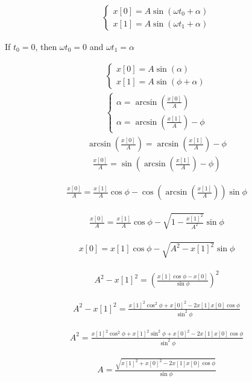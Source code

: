 \documentclass[fleqn]{article}
\begin{document}
\pagestyle{empty}

\begin{align*}
\begin{cases}
x[0]=A\sin(\omega t_{0}+\alpha)\\
x[1]=A\sin(\omega t_{1}+\alpha)
\end{cases}
\end{align*}

If $t_{0}=0$, then $\omega t_{0}=0$ and $\omega t_{1}=\alpha$

\begin{align*}
\begin{cases}
x[0]=A\sin(\alpha)\\
x[1]=A\sin(\phi+\alpha)
\end{cases}
\end{align*}
\begin{align*}
\begin{cases}
\alpha=\arcsin\left(\frac{x[0]}{A}\right)\\
\alpha=\arcsin\left(\frac{x[1]}{A}\right)-\phi
\end{cases}
\end{align*}
\begin{align*}
\arcsin\left(\frac{x[0]}{A}\right)=\arcsin\left(\frac{x[1]}{A}\right)-\phi
\end{align*}
\begin{align*}
\frac{x[0]}{A}=\sin\left(\arcsin\left(\frac{x[1]}{A}\right)-\phi\right)
\end{align*}

\begin{align*}
\frac{x[0]}{A}=\frac{x[1]}{A}\cos\phi-\cos\left(\arcsin\left(\frac{x[1]}{A}\right)\right)\sin\phi
\end{align*}

\begin{align*}
\frac{x[0]}{A}=\frac{x[1]}{A}\cos\phi-\sqrt{1-\frac{x[1]^{2}}{A^{2}}}\sin\phi
\end{align*}

\begin{align*}
x[0]=x[1]\cos\phi-\sqrt{A^{2}-x[1]^{2}}\sin\phi
\end{align*}

\begin{align*}
A^{2}-x[1]^{2}=\left(\frac{x[1]\cos\phi-x[0]}{\sin\phi}\right)^{2}
\end{align*}

\begin{align*}
A^{2}-x[1]^{2}=\frac{x[1]^{2}\cos^{2}\phi+x[0]^{2}-2x[1]x[0]\cos\phi}{\sin^{2}\phi}
\end{align*}

\begin{align*}
A^{2}=\frac{x[1]^{2}\cos^{2}\phi+x[1]^{2}\sin^{2}\phi+x[0]^{2}-2x[1]x[0]\cos\phi}{\sin^{2}\phi}
\end{align*}

\begin{align*}
A=\frac{\sqrt{x[1]^{2}+x[0]^{2}-2x[1]x[0]\cos\phi}}{\sin\phi}
\end{align*}
\end{document}
